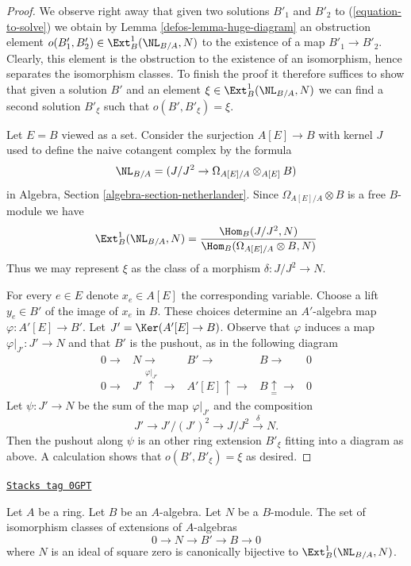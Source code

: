 \begin{proof}

We observe right away that given two solutions $B'_1$ and $B'_2$
to (\ref{equation-to-solve}) we obtain by Lemma \ref{defos-lemma-huge-diagram} an
obstruction element $o(B'_1, B'_2) \in \Ext^1_B(\NL_{B/A}, N)$
to the existence of a map $B'_1 \to B'_2$. Clearly, this element
is the obstruction to the existence of an isomorphism, hence separates
the isomorphism classes. To finish the proof it therefore suffices to
show that given a solution $B'$ and an element
$\xi \in \Ext^1_B(\NL_{B/A}, N)$
we can find a second solution $B'_\xi$ such that
$o(B', B'_\xi) = \xi$.

\medskip\noindent
Let $E = B$ viewed as a set. Consider the surjection $A[E] \to B$ with kernel
$J$ used to define the naive cotangent complex by the formula
$$
\NL_{B/A} = (J/J^2 \to \Omega_{A[E]/A} \otimes_{A[E]} B)
$$
in Algebra, Section \ref{algebra-section-netherlander}.
Since $\Omega_{A[E]/A} \otimes B$ is a free $B$-module we have
$$
\Ext^1_B(\NL_{B/A}, N) =
\frac{\Hom_B(J/J^2, N)}
{\Hom_B(\Omega_{A[E]/A} \otimes B, N)}
$$
Thus we may represent $\xi$ as the class of a morphism $\delta : J/J^2 \to N$.

\medskip\noindent
For every $e \in E$ denote $x_e \in A[E]$ the corresponding variable.
Choose a lift $y_e \in B'$ of the image of $x_e$ in $B$.
These choices determine an $A'$-algebra map $\varphi : A'[E] \to B'$.
Let $J' = \Ker(A'[E] \to B)$. Observe that $\varphi$ induces a map
$\varphi|_{J'} : J' \to N$ and that $B'$ is the pushout, as in the following
diagram
$$
\begin{array}{ccccc}0 \longrightarrow & N \longrightarrow & B' \longrightarrow & B \longrightarrow & 0 \\ 0 \longrightarrow & J' \overset{\varphi|_{J'}}{\uparrow}\longrightarrow & A'[E] \uparrow\longrightarrow & B \underset{=}{\uparrow}\longrightarrow & 0\end{array}
$$
Let $\psi : J' \to N$ be the sum of the map $\varphi|_{J'}$ and the
composition
$$
J' \to J'/(J')^2 \to J/J^2 \xrightarrow{\delta} N.
$$
Then the pushout along $\psi$ is an other ring extension $B'_\xi$
fitting into a diagram as above. A calculation shows that
$o(B', B'_\xi) = \xi$ as desired.
\end{proof}

\begin{lemma}
\label{defos-lemma-extensions-of-algebras}
\href{https://stacks.math.columbia.edu/tag/0GPT}{\texttt{Stacks tag 0GPT}}

Let $A$ be a ring. Let $B$ be an $A$-algebra. Let $N$ be a $B$-module.
The set of isomorphism classes of extensions of $A$-algebras
$$
0 \to N \to B' \to B \to 0
$$
where $N$ is an ideal of square zero is canonically bijective to
$\Ext^1_B(\NL_{B/A}, N)$.
\end{lemma}

